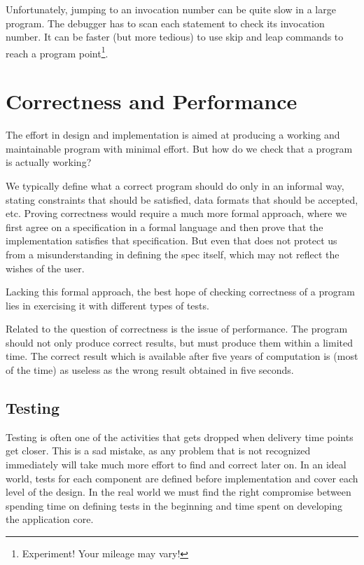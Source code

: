 \documentclass[a4paper,12pt]{report}
\begin{document}
Unfortunately, jumping to an invocation number can be quite slow in a large program. The debugger has to scan each statement to check its invocation number. It can be faster (but more tedious) to use skip and leap commands to reach a program point\footnote{Experiment! Your mileage may vary!}.

\chapter{Correctness and Performance}
\label{correctnessandperformance}

The effort in design and implementation is aimed at producing a working and maintainable program with minimal effort. But how do we check that a program is actually working?

We typically define what a correct program should do only in an informal way, stating constraints that should be satisfied, data formats that should be accepted, etc. Proving correctness would require a much more formal approach, where we first agree on a specification in a formal language and then prove that the implementation satisfies that specification. But even that does not protect us from a misunderstanding in defining the spec itself, which may not reflect the wishes of the user.

Lacking this formal approach, the best hope of checking correctness of a program lies in exercising it with different types of tests.

Related to the question of correctness is the issue of performance. The program should not only produce correct results, but must produce them within a limited time. The correct result which is available after five years of computation is (most of the time) as useless as the wrong result obtained in five seconds.

\section{Testing}
Testing is often one of the activities that gets dropped when delivery time points get closer. This is a sad mistake, as any problem that is not recognized immediately will take much more effort to find and correct later on. In an ideal world, tests for each component are defined before implementation and cover each level of the design. In the real world we must find the right compromise between spending time on defining tests in the beginning and time spent on developing the application core.
\end{document}
